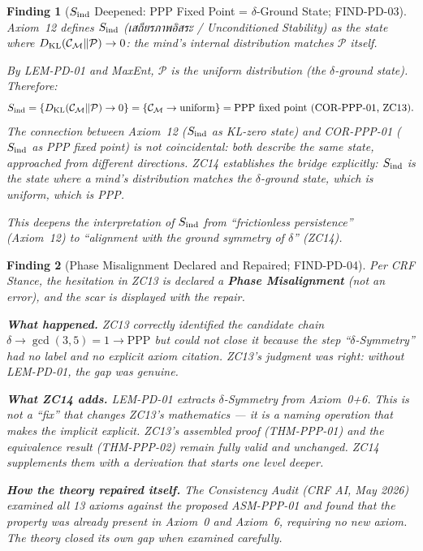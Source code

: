 \documentclass[12pt, a4paper]{article}
\newtheorem{finding}{Finding}[section]
\begin{document}
\begin{finding}[$S_{\rm ind}$ Deepened: PPP Fixed Point =
  $\delta$-Ground State; FIND-PD-03]
\label{zc14:find:pd-03}
Axiom~12 defines $S_{\rm ind}$ (เสถียรภาพอิสระ /
Unconditioned Stability) as the state where
$D_{\rm KL}(\mathcal{C}_\mathcal{M} \| \mathcal{P}) \to 0$:
the mind's internal distribution matches $\mathcal{P}$ itself.

By LEM-PD-01 and MaxEnt, $\mathcal{P}$ \emph{is} the uniform
distribution (the $\delta$-ground state). Therefore:
\[
  S_{\rm ind} = \{D_{\rm KL}(\mathcal{C}_\mathcal{M}
  \| \mathcal{P}) \to 0\}
  = \{\mathcal{C}_\mathcal{M} \to \text{uniform}\}
  = \text{PPP fixed point (COR-PPP-01, ZC13)}.
\]
The connection between Axiom~12 ($S_{\rm ind}$ as KL-zero state)
and COR-PPP-01 ($S_{\rm ind}$ as PPP fixed point) is not
coincidental: both describe the same state, approached from
different directions. ZC14 establishes the bridge explicitly:
$S_{\rm ind}$ is the state where a mind's distribution matches
the $\delta$-ground state, which is uniform, which is PPP.

This deepens the interpretation of $S_{\rm ind}$ from
``frictionless persistence'' (Axiom~12) to
``alignment with the ground symmetry of $\delta$'' (ZC14).
\end{finding}

\begin{finding}[Phase Misalignment Declared and Repaired;
  FIND-PD-04]
\label{zc14:find:pd-04}
Per CRF Stance, the hesitation in ZC13 is declared a
\textbf{Phase Misalignment} (not an error), and the scar is
displayed with the repair.

\textbf{What happened.} ZC13 correctly identified the candidate
chain $\delta \to \gcd(3,5)=1 \to \text{PPP}$ but could not
close it because the step ``$\delta$-Symmetry'' had no label
and no explicit axiom citation. ZC13's judgment was right:
without LEM-PD-01, the gap was genuine.

\textbf{What ZC14 adds.} LEM-PD-01 extracts $\delta$-Symmetry
from Axiom~0+6. This is not a ``fix'' that changes ZC13's
mathematics --- it is a \emph{naming} operation that makes the
implicit explicit. ZC13's assembled proof (THM-PPP-01) and the
equivalence result (THM-PPP-02) remain fully valid and
unchanged. ZC14 supplements them with a derivation that starts
one level deeper.

\textbf{How the theory repaired itself.} The Consistency Audit
(CRF AI, May 2026) examined all 13 axioms against the proposed
ASM-PPP-01 and found that the property was already present in
Axiom~0 and Axiom~6, requiring no new axiom. The theory
closed its own gap when examined carefully.
\end{finding}
\end{document}
